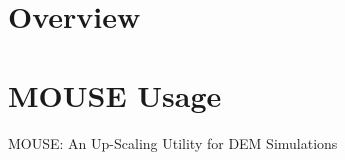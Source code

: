 \documentclass[letterpaper,10pt,english]{sphinxmanual}
\begin{document}
\section{Overview}
\label{\detokenize{MouseReferenceManual:overview}}

\section{MOUSE Usage}
\label{\detokenize{MouseReferenceManual:mouse-usage}}

MOUSE: An Up-Scaling Utility for DEM Simulations


\begin{sphinxVerbatim}[commandchars=\\\{\}]
  \PYG{p}{[}\PYG{p}{]}  
\end{sphinxVerbatim}
\end{document}
